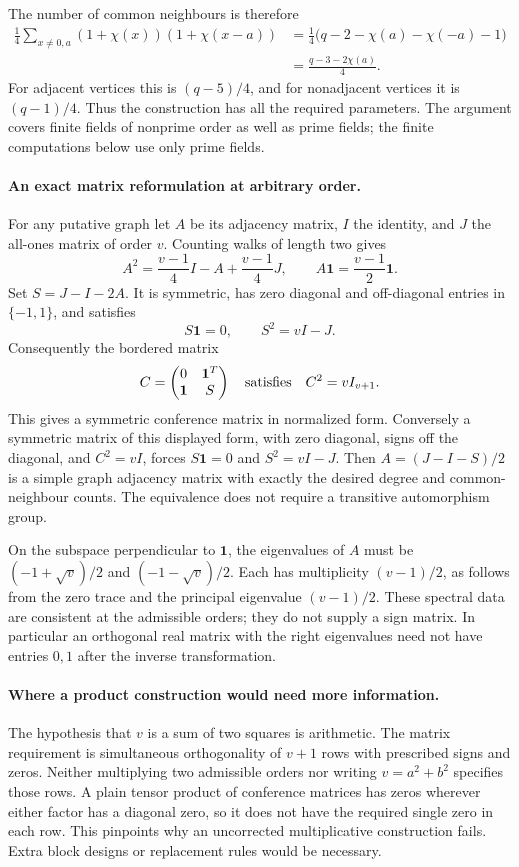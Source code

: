 \documentclass[11pt,a4paper]{article}
\begin{document}
The number of common neighbours is therefore
\begin{align*}
 \frac14\sum_{x\ne0,a}(1+\chi(x))(1+\chi(x-a))
 &=\frac14\bigl(q-2-\chi(a)-\chi(-a)-1\bigr)\\
 &=\frac{q-3-2\chi(a)}4.
\end{align*}
For adjacent vertices this is $(q-5)/4$, and for nonadjacent vertices
it is $(q-1)/4$. Thus the construction has all the required parameters.
The argument covers finite fields of nonprime order as well as prime
fields; the finite computations below use only prime fields.

\paragraph{An exact matrix reformulation at arbitrary order.}
For any putative graph let $A$ be its adjacency matrix, $I$ the identity,
and $J$ the all-ones matrix of order $v$. Counting walks of length two
gives
\[
 A^2=\frac{v-1}{4}I-A+\frac{v-1}{4}J,
 \qquad A\mathbf1=\frac{v-1}{2}\mathbf1.
\]
Set $S=J-I-2A$. It is symmetric, has zero diagonal and off-diagonal
entries in $\{-1,1\}$, and satisfies
\[
                 S\mathbf1=0,\qquad S^2=vI-J.
\]
Consequently the bordered matrix
\[
             C=\begin{pmatrix}0&\mathbf1^T\\\mathbf1&S\end{pmatrix}
             \quad\hbox{satisfies}\quad C^2=vI_{v+1}.
\]
This gives a symmetric conference matrix in normalized form.
Conversely a symmetric matrix of this displayed form, with zero
diagonal, signs off the diagonal, and $C^2=vI$, forces
$S\mathbf1=0$ and $S^2=vI-J$. Then $A=(J-I-S)/2$ is a simple graph
adjacency matrix with exactly the desired degree and common-neighbour
counts. The equivalence does not require a transitive automorphism group.

On the subspace perpendicular to $\mathbf1$, the eigenvalues of $A$
must be $(-1+\sqrt v)/2$ and $(-1-\sqrt v)/2$. Each has multiplicity
$(v-1)/2$, as follows from the zero trace and the principal eigenvalue
$(v-1)/2$. These spectral data are consistent at the admissible orders;
they do not supply a sign matrix. In particular an orthogonal real
matrix with the right eigenvalues need not have entries $0,1$ after
the inverse transformation.

\paragraph{Where a product construction would need more information.}
The hypothesis that $v$ is a sum of two squares is arithmetic. The
matrix requirement is simultaneous orthogonality of $v+1$ rows with
prescribed signs and zeros. Neither multiplying two admissible orders
nor writing $v=a^2+b^2$ specifies those rows. A plain tensor product of
conference matrices has zeros wherever either factor has a diagonal
zero, so it does not have the required single zero in each row.
This pinpoints why an uncorrected multiplicative construction fails.
Extra block designs or replacement rules would be necessary.
\end{document}
